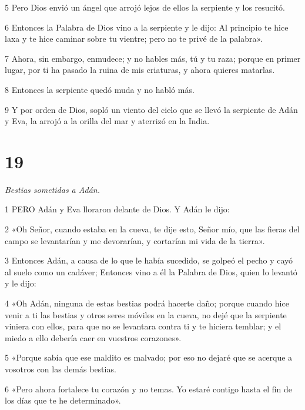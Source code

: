 \par 5 Pero Dios envió un ángel que arrojó lejos de ellos la serpiente y los resucitó.

\par 6 Entonces la Palabra de Dios vino a la serpiente y le dijo: Al principio te hice laxa y te hice caminar sobre tu vientre; pero no te privé de la palabra».

\par 7 Ahora, sin embargo, enmudece; y no hables más, tú y tu raza; porque en primer lugar, por ti ha pasado la ruina de mis criaturas, y ahora quieres matarlas.

\par 8 Entonces la serpiente quedó muda y no habló más.

\par 9 Y por orden de Dios, sopló un viento del cielo que se llevó la serpiente de Adán y Eva, la arrojó a la orilla del mar y aterrizó en la India.

\chapter{19}

\par \textit{Bestias sometidas a Adán.}

\par 1 PERO Adán y Eva lloraron delante de Dios. Y Adán le dijo:

\par 2 «Oh Señor, cuando estaba en la cueva, te dije esto, Señor mío, que las fieras del campo se levantarían y me devorarían, y cortarían mi vida de la tierra».

\par 3 Entonces Adán, a causa de lo que le había sucedido, se golpeó el pecho y cayó al suelo como un cadáver; Entonces vino a él la Palabra de Dios, quien lo levantó y le dijo:

\par 4 «Oh Adán, ninguna de estas bestias podrá hacerte daño; porque cuando hice venir a ti las bestias y otros seres móviles en la cueva, no dejé que la serpiente viniera con ellos, para que no se levantara contra ti y te hiciera temblar; y el miedo a ello debería caer en vuestros corazones».

\par 5 «Porque sabía que ese maldito es malvado; por eso no dejaré que se acerque a vosotros con las demás bestias.

\par 6 «Pero ahora fortalece tu corazón y no temas. Yo estaré contigo hasta el fin de los días que te he determinado».

